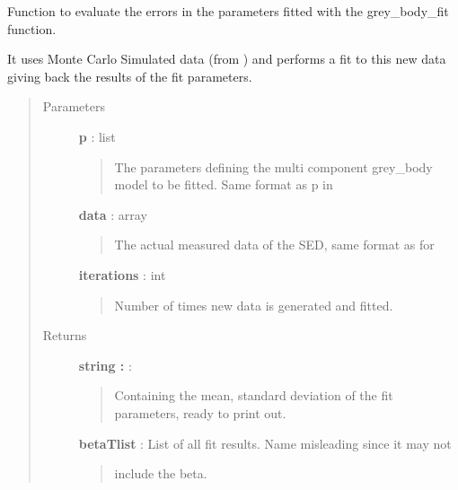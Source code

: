 \documentclass[a4paper,10pt,english]{sphinxmanual}
\begin{document}
\begin{fulllineitems}
\label{functions:astrolyze.functions.astro_functions.grey_body_monte_carlo}
Function to evaluate the errors in the parameters fitted with the
grey\_body\_fit function.

It uses Monte Carlo Simulated data (from
{\hyperref[functions:astrolyze.functions.astro_functions.generate_monte_carlo_data_sed]{}}) and performs a fit to this new data
giving back the results of the fit parameters.
\begin{quote}\begin{description}
\item[{Parameters }] \leavevmode
\textbf{p} : list
\begin{quote}

The parameters defining the multi component grey\_body model to be
fitted. Same format as p in {\hyperref[functions:astrolyze.functions.astro_functions.multi_component_grey_body]{}}
\end{quote}

\textbf{data} : array
\begin{quote}

The actual measured data of the SED, same format as for
\end{quote}

\textbf{iterations} : int
\begin{quote}

Number of times new data is generated and fitted.
\end{quote}

\item[{Returns }] \leavevmode
\textbf{string :} :
\begin{quote}

Containing the mean, standard deviation of the fit parameters, ready
to print out.
\end{quote}

\textbf{betaTlist} : List of all fit results. Name misleading since it may not
\begin{quote}

include the beta.
\end{quote}

\end{description}\end{quote}

\end{fulllineitems}
\end{document}
